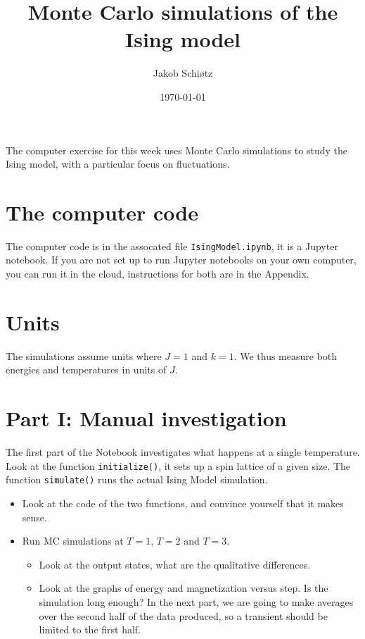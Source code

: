 \documentclass[a4paper,11pt]{article}
\begin{document}
\title{Monte Carlo simulations of the Ising model}
\author{Jakob Schiøtz}
\date{\today}
\maketitle

The computer exercise for this week uses Monte Carlo simulations to
study the Ising model, with a particular focus on fluctuations.

\section{The computer code}

The computer code is in the assocated file \texttt{IsingModel.ipynb},
it is a Jupyter notebook.  If you are not set up to run Jupyter
notebooks on your own computer, you can run it in the cloud,
instructions for both are in the Appendix.

\section{Units}

The simulations assume units where $J=1$ and $k=1$.  We thus measure
both energies and temperatures in units of $J$.

\section{Part I: Manual investigation}

The first part of the Notebook investigates what happens at a single
temperature.  Look at the function \texttt{initialize()}, it sets up a
spin lattice of a given size.  The function \texttt{simulate()} runs
the actual Ising Model simulation.

\begin{itemize}
\item Look at the code of the two functions, and convince yourself
  that it makes sense.
\item Run MC simulations at $T=1$, $T=2$ and $T=3$.
  \begin{itemize}
  \item Look at the output states, what are the qualitative
    differences.
  \item Look at the graphs of energy and magnetization versus step.
    Is the simulation long enough?  In the next part, we are going to
    make averages over the second half of the data produced, so a
    transient should be limited to the first half.
  \end{itemize}
\end{itemize}
\end{document}
